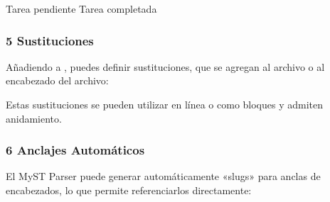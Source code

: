 \documentclass[a4paper,10pt,spanish]{sphinxmanual}
\begin{document}
\begin{sphinxVerbatim}[commandchars=\\\{\}]
 Tarea pendiente
 Tarea completada
\end{sphinxVerbatim}


\subsubsection{5 Sustituciones}
\label{\detokenize{configuracion_inicial/013.guia_de_myst_parser:sustituciones}}
\sphinxAtStartPar
Añadiendo  a , puedes definir sustituciones, que se agregan al archivo  o al encabezado del archivo:

\begin{sphinxVerbatim}[commandchars=\\\{\}]
\end{sphinxVerbatim}

\sphinxAtStartPar
Estas sustituciones se pueden utilizar en línea o como bloques y admiten anidamiento.


\subsubsection{6 Anclajes Automáticos}
\label{\detokenize{configuracion_inicial/013.guia_de_myst_parser:anclajes-automaticos}}
\sphinxAtStartPar
El MyST Parser puede generar automáticamente «slugs» para anclas de encabezados, lo que permite referenciarlos directamente:

\begin{sphinxVerbatim}[commandchars=\\\{\}]
  
\end{sphinxVerbatim}
\end{document}
